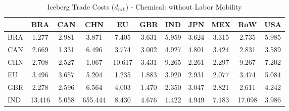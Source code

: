 \begin{table}[htbp]
\centering
\caption{Iceberg Trade Costs ($d_{nik}$) - Chemical: without Labor Mobility} 
\label{tab:iceberg_Chemical}
\begin{tabular}{lcccccccccc}
  \hline
 & BRA & CAN & CHN & EU & GBR & IND & JPN & MEX & RoW & USA \\ 
  \hline
BRA & \textcolor[RGB]{242,157,13}{1.277} & \textcolor[RGB]{145,94,110}{2.981} & \textcolor[RGB]{82,53,173}{3.871} & \textcolor[RGB]{20,13,235}{7.405} & \textcolor[RGB]{92,59,163}{3.631} & \textcolor[RGB]{36,23,219}{5.959} & \textcolor[RGB]{97,63,158}{3.624} & \textcolor[RGB]{120,78,135}{3.315} & \textcolor[RGB]{166,107,89}{2.735} & \textcolor[RGB]{33,21,222}{5.985} \\ 
  CAN & \textcolor[RGB]{173,112,82}{2.669} & \textcolor[RGB]{237,153,18}{1.331} & \textcolor[RGB]{31,20,224}{6.496} & \textcolor[RGB]{84,54,171}{3.774} & \textcolor[RGB]{143,92,112}{3.002} & \textcolor[RGB]{48,31,207}{4.927} & \textcolor[RGB]{51,33,204}{4.801} & \textcolor[RGB]{117,76,138}{3.424} & \textcolor[RGB]{161,104,94}{2.831} & \textcolor[RGB]{99,64,156}{3.589} \\ 
  CHN & \textcolor[RGB]{168,109,87}{2.708} & \textcolor[RGB]{184,119,71}{2.527} & \textcolor[RGB]{252,163,3}{1.067} & \textcolor[RGB]{8,5,247}{10.617} & \textcolor[RGB]{112,73,143}{3.431} & \textcolor[RGB]{13,8,242}{9.265} & \textcolor[RGB]{201,130,54}{2.261} & \textcolor[RGB]{196,127,59}{2.297} & \textcolor[RGB]{10,7,245}{9.267} & \textcolor[RGB]{23,15,232}{7.202} \\ 
  EU & \textcolor[RGB]{107,69,148}{3.496} & \textcolor[RGB]{89,58,166}{3.657} & \textcolor[RGB]{38,25,217}{5.204} & \textcolor[RGB]{245,158,10}{1.235} & \textcolor[RGB]{219,142,36}{1.883} & \textcolor[RGB]{79,51,176}{3.920} & \textcolor[RGB]{148,96,107}{2.931} & \textcolor[RGB]{209,135,46}{2.077} & \textcolor[RGB]{110,71,145}{3.474} & \textcolor[RGB]{41,26,214}{5.084} \\ 
  GBR & \textcolor[RGB]{199,129,56}{2.278} & \textcolor[RGB]{178,115,76}{2.596} & \textcolor[RGB]{28,18,227}{6.564} & \textcolor[RGB]{71,46,184}{4.003} & \textcolor[RGB]{227,147,28}{1.470} & \textcolor[RGB]{194,125,61}{2.350} & \textcolor[RGB]{128,82,128}{3.047} & \textcolor[RGB]{163,106,92}{2.821} & \textcolor[RGB]{176,114,79}{2.611} & \textcolor[RGB]{66,43,189}{4.242} \\ 
  IND & \textcolor[RGB]{5,3,250}{13.416} & \textcolor[RGB]{43,28,212}{5.058} & \textcolor[RGB]{0,0,255}{655.444} & \textcolor[RGB]{15,10,240}{8.430} & \textcolor[RGB]{54,35,201}{4.676} & \textcolor[RGB]{232,150,23}{1.422} & \textcolor[RGB]{46,30,209}{4.949} & \textcolor[RGB]{25,16,230}{7.183} & \textcolor[RGB]{3,2,252}{17.098} & \textcolor[RGB]{74,48,181}{3.986} \\ 

\end{tabular}
\end{table}
